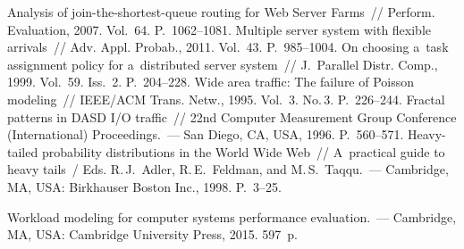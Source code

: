 \begin{multicols}{2}
{{\begin{thebibliography}{99}
     Analysis of 
    join-the-shortest-queue routing for Web Server Farms~// Perform. Evaluation, 2007. 
Vol.~64. P.~1062--1081.
     Multiple server system with flexible arrivals~// 
Adv. Appl. Probab., 2011. Vol.~43. P.~985--1004.
     On choosing a~task assignment policy 
for a~distributed server system~// J.~Parallel Distr. Comp., 1999. Vol.~59. Iss.~2. 
P.~204--228.
     Wide area traffic: The failure of Poisson modeling~// IEEE/ACM 
Trans. Netw., 1995. Vol.~3. No.\,3. P.~226--244.
     Fractal patterns in DASD I/O traffic~// 22nd Computer 
Measurement Group Conference (International) Proceedings.~--- San Diego, CA, USA, 1996. 
P.~560--571.
     Heavy-tailed probability distributions in the 
World Wide Web~// A~practical guide to heavy tails~/ Eds. R.\,J.~Adler, R.\,E.~Feldman, and 
M.\,S.~Taqqu.~--- Cambridge, MA, USA: Birkhauser Boston Inc., 1998. P.~3--25.
   
     Workload modeling for computer systems performance evaluation.~--- 
Cambridge, MA, USA: Cambridge University Press, 2015. 597~p.
   

\end{thebibliography}}}
\end{multicols}
